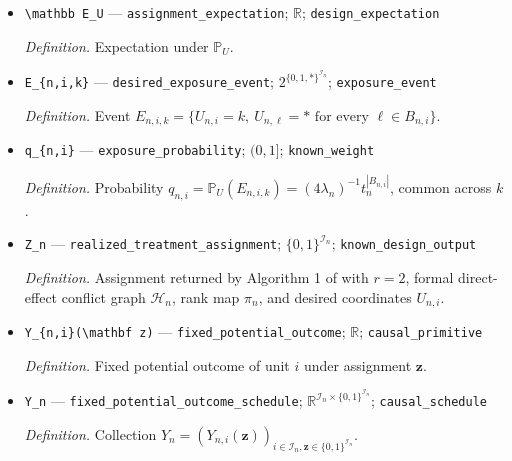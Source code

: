 \documentclass{article}
\begin{document}
\begin{itemize}
  \par\smallskip\noindent\emph{Definition.} Probability under the product law of \(U_{n,i}\), conditional on the fixed graph and potential outcomes.
  \item \texttt{\textbackslash{}\allowbreak{}mathbb E\_\allowbreak{}U} --- \texttt{assignment\_\allowbreak{}expectation}; \(\mathbb R\); \texttt{design\_\allowbreak{}expectation}
  \par\smallskip\noindent\emph{Definition.} Expectation under \(\mathbb P_U\).
  \item \texttt{E\_\allowbreak{}\{n,\allowbreak{}i,\allowbreak{}k\}\allowbreak{}} --- \texttt{desired\_\allowbreak{}exposure\_\allowbreak{}event}; \(2^{\{0,1,*\}^{\mathcal I_n}}\); \texttt{exposure\_\allowbreak{}event}
  \par\smallskip\noindent\emph{Definition.} Event \(E_{n,i,k}=\{U_{n,i}=k,\ U_{n,\ell}=*\text{ for every }\ell\in B_{n,i}\}\).
  \item \texttt{q\_\allowbreak{}\{n,\allowbreak{}i\}\allowbreak{}} --- \texttt{exposure\_\allowbreak{}probability}; \((0,1]\); \texttt{known\_\allowbreak{}weight}
  \par\smallskip\noindent\emph{Definition.} Probability \(q_{n,i}=\mathbb P_U(E_{n,i,k})=(4\lambda_n)^{-1}t_n^{|B_{n,i}|}\), common across \(k\).
  \item \texttt{Z\_\allowbreak{}n} --- \texttt{realized\_\allowbreak{}treatment\_\allowbreak{}assignment}; \(\{0,1\}^{\mathcal I_n}\); \texttt{known\_\allowbreak{}design\_\allowbreak{}output}
  \par\smallskip\noindent\emph{Definition.} Assignment returned by Algorithm 1 of \cite{KandirosPipisDaskalakisHarshaw2024CGD} with \(r=2\), formal direct-effect conflict graph \(\mathcal H_n\), rank map \(\pi_n\), and desired coordinates \(U_{n,i}\).
  \item \texttt{Y\_\allowbreak{}\{n,\allowbreak{}i\}\allowbreak{}(\textbackslash{}\allowbreak{}mathbf z)} --- \texttt{fixed\_\allowbreak{}potential\_\allowbreak{}outcome}; \(\mathbb R\); \texttt{causal\_\allowbreak{}primitive}
  \par\smallskip\noindent\emph{Definition.} Fixed potential outcome of unit \(i\) under assignment \(\mathbf z\).
  \item \texttt{Y\_\allowbreak{}n} --- \texttt{fixed\_\allowbreak{}potential\_\allowbreak{}outcome\_\allowbreak{}schedule}; \(\mathbb R^{\mathcal I_n\times\{0,1\}^{\mathcal I_n}}\); \texttt{causal\_\allowbreak{}schedule}
  \par\smallskip\noindent\emph{Definition.} Collection \(Y_n=(Y_{n,i}(\mathbf z))_{i\in\mathcal I_n,\mathbf z\in\{0,1\}^{\mathcal I_n}}\).

\end{itemize}
\end{document}
